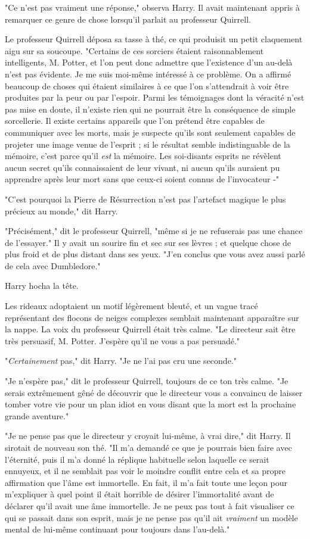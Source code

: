 "Ce n'est pas vraiment une réponse," observa Harry. Il avait maintenant appris à remarquer ce genre de chose lorsqu'il parlait au professeur Quirrell.

Le professeur Quirrell déposa sa tasse à thé, ce qui produisit un petit claquement aigu sur sa soucoupe. "Certains de ces sorciers étaient raisonnablement intelligents, M. Potter, et l'on peut donc admettre que l'existence d'un au-delà n'est pas évidente. Je me suis moi-même intéressé à ce problème. On a affirmé beaucoup de choses qui étaient similaires à ce que l'on s'attendrait à voir être produites par la peur ou par l'espoir. Parmi les témoignages dont la véracité n'est pas mise en doute, il n'existe rien qui ne pourrait être la conséquence de simple sorcellerie. Il existe certains appareils que l'on prétend être capables de communiquer avec les morts, mais je suspecte qu'ils sont seulement capables de projeter une image venue de l'esprit ; si le résultat semble indistinguable de la mémoire, c'est parce qu'il \emph{est}  la mémoire. Les soi-disants esprits ne révèlent aucun secret qu'ils connaissaient de leur vivant, ni aucun qu'ils auraient pu apprendre après leur mort sans que ceux-ci soient connus de l'invocateur -"

"C'est pourquoi la Pierre de Résurrection n'est pas l'artefact magique le plus précieux au monde," dit Harry.

"Précisément," dit le professeur Quirrell, "même si je ne refuserais pas une chance de l'essayer." Il y avait un sourire fin et sec sur ses lèvres ; et quelque chose de plus froid et de plus distant dans ses yeux. "J'en conclus que vous avez aussi parlé de cela avec Dumbledore."

Harry hocha la tête.

Les rideaux adoptaient un motif légèrement bleuté, et un vague tracé représentant des flocons de neiges complexes semblait maintenant apparaître sur la nappe. La voix du professeur Quirrell était très calme. "Le directeur sait être très persuasif, M. Potter. J'espère qu'il ne vous a pas persuadé."

"\emph{Certainement}  pas," dit Harry. "Je ne l'ai pas cru une seconde."

"Je n'espère pas," dit le professeur Quirrell, toujours de ce ton très calme. "Je serais extrêmement gêné de découvrir que le directeur vous a convaincu de laisser tomber votre vie pour un plan idiot en vous disant que la mort est la prochaine grande aventure."

"Je ne pense pas que le directeur y croyait lui-même, à vrai dire," dit Harry. Il sirotait de nouveau son thé. "Il m'a demandé ce que je pourrais bien faire avec l'éternité, puis il m'a donné la réplique habituelle selon laquelle ce serait ennuyeux, et il ne semblait pas voir le moindre conflit entre cela et sa propre affirmation que l'âme est immortelle. En fait, il m'a fait toute une leçon pour m'expliquer à quel point il était horrible de désirer l'immortalité avant de déclarer qu'il avait une âme immortelle. Je ne peux pas tout à fait visualiser ce qui se passait dans son esprit, mais je ne pense pas qu'il ait \emph{vraiment}  un modèle mental de lui-même continuant pour toujours dans l'au-delà."

